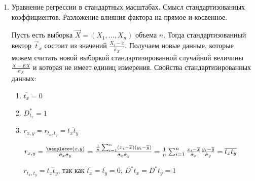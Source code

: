 \begin{enumerate}
    Пусть $X = \beta_0 + \beta_1 Z_1 + \dots + \beta_k Z_k + \varepsilon$ -- теоретическая модель линейной регрессии, $\varepsilon \in N(0, \sigma^2)$ и независимы

    По методу наименьших квадратов была построена модель $\hat X = b_0 + b_1 Z_1 + \dots + b_k Z_k$. Тогда $\hat \varepsilon_i = X_i - \hat X_i$ -- экспериментальная (или эмпирическая) ошибка

    Согласно следствию из теоремы $S^2 = \frac{1}{n - k - 1} \sum_{i = 1}^n \hat \varepsilon_i^2$ -- несмещенная оценка $\sigma^2$

    \Def Величину $S$ называют стандартной ошибкой регрессии 

    Из прошлых лекций знаем, что $D b_i = \sigma^2 (A^{-1})_{ii}$, где $A = Z Z^T$, $Z = (Z:{(i)}_j)$ -- матрица плана

    Из этого $\hat D b_i = S^2 (A^{-1})_{ii}$ -- оценка дисперсии

    \Def $S_{b_i} = S \sqrt{(A^{-1})_{ii}}$ -- стандартная ошибка коэффициента регрессии $b_i$

    \item Уравнение регрессии в стандартных масштабах. Смысл стандартизованных коэффициентов. Разложение влияния фактора на прямое и косвенное.

    Пусть есть выборка $\vec X = (X_1, \dots, X_n)$ объема $n$. Тогда стандартизованный вектор $\vec t_x$ состоит из значений $\frac{X_i - \overline{x}}{\hat \sigma_X}$. Получаем новые данные, которые можем считать новой выборкой стандартизированной случайной величины $\frac{X - EX}{\sigma_X}$ и которая не имеет единиц измерения. Свойства стандартизированных данных:

    \begin{enumerate}
        \item $\overline{t_x} = 0$
        \item $D^*_{t_x} = 1$
        \item $r_{x,y} = r_{t_x, t_y} = \overline{t_x t_y}$
        \begin{MyProof}
            $r_{x,y} = \frac{\samplecov(x, y)}{\hat \sigma_x \hat \sigma_y} = 
            \frac{\frac{1}{n} \sum_{i = 1}^n (x_i - \overline{x})(y_i - \overline{y})}{\hat \sigma_x \hat \sigma_y} = 
            \frac{1}{n} \sum_{i = 1}^n \frac{x_i - \overline{x}}{\hat \sigma_x} \frac{y_i - \overline{y}}{\hat \sigma_y} = \overline{t_x t_y}$

            $r_{t_x, t_y} = \overline{t_x t_y}$, так как $\overline{t_x} = \overline{t_y} = 0$, $D^* t_x = D^* t_y = 1$
        \end{MyProof}
    \end{enumerate}


\end{enumerate}
